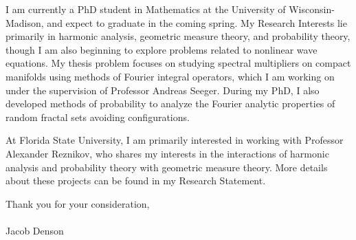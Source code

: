 \documentclass[11pt,stdletter,orderfromtodate,sigleft]{newlfm}
\begin{document}
\begin{newlfm}

I am currently a PhD student in Mathematics at the University of Wisconsin-Madison, and expect to graduate in the coming spring. My Research Interests lie primarily in harmonic analysis, geometric measure theory, and probability theory, though I am also beginning to explore problems related to nonlinear wave equations. My thesis problem focuses on studying spectral multipliers on compact manifolds using methods of Fourier integral operators, which I am working on under the supervision of Professor Andreas Seeger. During my PhD, I also developed methods of probability to analyze the Fourier analytic properties of random fractal sets avoiding configurations.

At Florida State University, I am primarily interested in working with Professor Alexander Reznikov, who shares my interests in the interactions of harmonic analysis and probability theory with geometric measure theory. More details about these projects can be found in my Research Statement.

Thank you for your consideration,\\\\
Jacob Denson

\end{newlfm}
\end{document}
